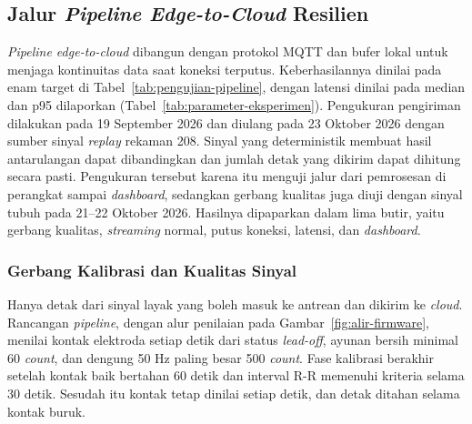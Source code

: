 \subsection{Jalur \textit{Pipeline Edge-to-Cloud} Resilien}

\textit{Pipeline edge-to-cloud} dibangun dengan protokol MQTT dan bufer lokal untuk menjaga kontinuitas data saat koneksi terputus. Keberhasilannya dinilai pada enam target di Tabel~\ref{tab:pengujian-pipeline}, dengan latensi dinilai pada median dan p95 dilaporkan (Tabel~\ref{tab:parameter-eksperimen}). Pengukuran pengiriman dilakukan pada 19 September 2026 dan diulang pada 23 Oktober 2026 dengan sumber sinyal \textit{replay} rekaman 208. Sinyal yang deterministik membuat hasil antarulangan dapat dibandingkan dan jumlah detak yang dikirim dapat dihitung secara pasti. Pengukuran tersebut karena itu menguji jalur dari pemrosesan di perangkat sampai \textit{dashboard}, sedangkan gerbang kualitas juga diuji dengan sinyal tubuh pada 21--22 Oktober 2026. Hasilnya dipaparkan dalam lima butir, yaitu gerbang kualitas, \textit{streaming} normal, putus koneksi, latensi, dan \textit{dashboard}.

\subsubsection{Gerbang Kalibrasi dan Kualitas Sinyal}

Hanya detak dari sinyal layak yang boleh masuk ke antrean dan dikirim ke \textit{cloud}. Rancangan \textit{pipeline}, dengan alur penilaian pada Gambar~\ref{fig:alir-firmware}, menilai kontak elektroda setiap detik dari status \textit{lead-off}, ayunan bersih minimal 60 \textit{count}, dan dengung 50 Hz paling besar 500 \textit{count}. Fase kalibrasi berakhir setelah kontak baik bertahan 60 detik dan interval R-R memenuhi kriteria selama 30 detik. Sesudah itu kontak tetap dinilai setiap detik, dan detak ditahan selama kontak buruk.

